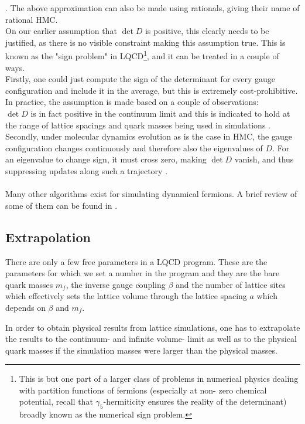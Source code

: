 \documentclass[a4paper,10pt]{article}
\begin{document}
\cite{BORICI1995645}. The above approximation can also be made using rationals, giving their name of rational HMC.\\On our earlier assumption that $\operatorname{det}D$ is positive, this clearly needs to be justified, as there is no visible constraint making this assumption true. This is known as the "sign problem" in LQCD\footnote{This is but one part of a larger class of problems in numerical physics dealing with partition functions of fermions (especially at non- zero chemical potential, recall that $\gamma_5$-hermiticity ensures the reality of the determinant) broadly known as the numerical sign problem.}, and it can be treated in a couple of ways.\\Firstly, one could just compute the sign of the determinant for every gauge configuration and include it in the average, but this is extremely cost-prohibitive.\\In practice, the assumption is made based on a couple of observations:\\$\operatorname{det}D$ is in fact positive in the continuum limit and this is indicated to hold at the range of lattice spacings and quark masses being used in simulations \cite{BORICI1995645}\cite{Zyla:2020zbs}.\\Secondly, under molecular dynamics evolution as is the case in HMC, the gauge configuration changes continuously and therefore also the eigenvalues of $D$. For an eigenvalue to change sign, it must cross zero, making $\operatorname{det}D$ vanish, and thus suppressing updates along such a trajectory \cite{JLQCD:2001ucs}.\\\\Many other algorithms exist for simulating dynamical fermions. A brief review of some of them can be found in \cite{schaefer2012status}.
\subsection{Extrapolation}
There are only a few free parameters in a LQCD program. These are the parameters for which we set a number in the program and they are the bare quark masses $m_f$, the inverse gauge coupling $\beta$ and the number of lattice sites which effectively sets the lattice volume through the lattice spacing $a$ which depends on $\beta$ and $m_f$.\par In order to obtain physical results from lattice simulations, one has to extrapolate the results to the continuum- and infinite volume- limit as well as to the physical quark masses if the simulation masses were larger than the physical masses.  
\end{document}
